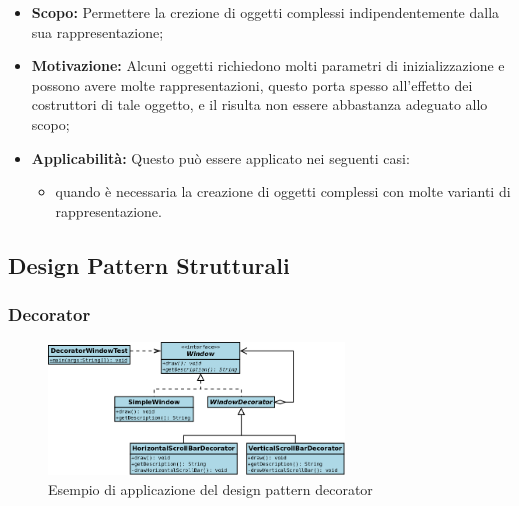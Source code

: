 \documentclass{scalatekids-article}
\begin{document}
\begin{itemize}

\item \textbf{Scopo:} Permettere la crezione di oggetti complessi indipendentemente dalla
  sua rappresentazione;

\item \textbf{Motivazione:} Alcuni oggetti richiedono molti parametri di inizializzazione
  e possono avere molte rappresentazioni, questo porta spesso all'effetto 
  dei costruttori di tale oggetto, e il   risulta non essere
  abbastanza adeguato allo scopo;

\item \textbf{Applicabilità:} Questo  può essere
  applicato nei seguenti casi:

  \begin{itemize}

  \item quando è necessaria la creazione di oggetti complessi con molte varianti
    di rappresentazione.

  \end{itemize}

\end{itemize}

\subsection{Design Pattern Strutturali}

\subsubsection{Decorator}

\begin{figure}[H]
  \begin{center}
    \includegraphics[width=0.7\textwidth, keepaspectratio]{img/designPattern/DecoratorPattern.png}
    \caption{Esempio di applicazione del design pattern decorator}
  \end{center}
\end{figure}
\end{document}
